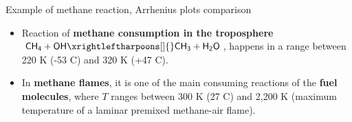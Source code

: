 \begin{frame}{Example of methane reaction, Arrhenius plots comparison}
	\lcol
	\begin{itemize}
			\item Reaction of {\bf methane consumption in the troposphere} $\mathsf{CH_4+OH  \xrightleftharpoons[]{} CH_3+H_2O}$, 
			happens in a range between 220 K (-53 \textdegree C) and 320 K (+47 \textdegree C). 
	\end{itemize}
	\rcol
	\begin{itemize}
		\item In {\bf methane flames}, it is one of the main consuming reactions of the {\bf fuel molecules}, where 
		$T$ ranges between 300 K (27 \textdegree C) and 2,200 K (maximum temperature of a laminar
		premixed methane-air flame). %
	\end{itemize}
	\ecol
	\begin{figure}[!t]
		\centering
		 \qquad \qquad
	\end{figure}

\end{frame}
%
